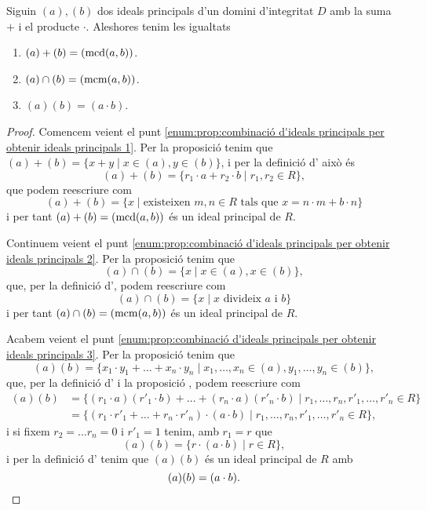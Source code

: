 \documentclass[../Apunts.tex]{subfiles}
\begin{document}
	\begin{proposition}
		\label{prop:combinació d'ideals principals per obtenir ideals principals}
		Siguin \((a),(b)\) dos ideals principals d'un domini d'integritat \(D\) amb la suma \(+\) i el producte \(\cdot\). Aleshores tenim les igualtats
		\begin{enumerate}
			\item\label{enum:prop:combinació d'ideals principals per obtenir ideals principals 1} \((a)+(b)=(\operatorname{mcd}(a,b))\).
			\item\label{enum:prop:combinació d'ideals principals per obtenir ideals principals 2} \((a)\cap(b)=(\operatorname{mcm}(a,b))\).
			\item\label{enum:prop:combinació d'ideals principals per obtenir ideals principals 3} \((a)(b)=(a\cdot b)\).
		\end{enumerate}
		\begin{proof}%
			Comencem veient el punt \eqref{enum:prop:combinació d'ideals principals per obtenir ideals principals 1}. Per la proposició  tenim que \((a)+(b)=\{x+y\mid x\in(a),y\in(b)\}\), i per la definició d' això és
			\[(a)+(b)=\{r_{1}\cdot a+r_{2}\cdot b\mid r_{1},r_{2}\in R\},\]
			que podem reescriure com
			\[(a)+(b)=\{x\mid\text{existeixen }m,n\in R\text{ tals que }x=n\cdot m+b\cdot n\}\]
			i per tant \((a)+(b)=(\operatorname{mcd}(a,b))\) és un ideal principal de \(R\). %
			
			Continuem veient el punt \eqref{enum:prop:combinació d'ideals principals per obtenir ideals principals 2}. Per la proposició  tenim que
			\[(a)\cap(b)=\{x\mid x\in(a),x\in(b)\},\]
			que, per la definició d', podem reescriure com
			\[(a)\cap(b)=\{x\mid x\text{ divideix }a\text{ i }b\}\]
			i per tant \((a)\cap(b)=(\operatorname{mcm}(a,b))\) és un ideal principal de \(R\). %
			
			Acabem veient el punt \eqref{enum:prop:combinació d'ideals principals per obtenir ideals principals 3}. Per la proposició  tenim que
			\[(a)(b)=\{x_{1}\cdot y_{1}+\dots+x_{n}\cdot y_{n}\mid x_{1},\dots,x_{n}\in(a),y_{1},\dots,y_{n}\in(b)\},\]
			que, per la definició d' i la proposició , podem reescriure com
			\begin{align*}
			(a)(b)&=\{(r_{1}\cdot a)(r'_{1}\cdot b)+\dots+(r_{n}\cdot a)(r'_{n}\cdot b)\mid r_{1},\dots,r_{n},r'_{1},\dots,r'_{n}\in R\}\\
			&=\{(r_{1}\cdot r'_{1}+\dots+r_{n}\cdot r'_{n})\cdot(a\cdot b)\mid r_{1},\dots,r_{n},r'_{1},\dots,r'_{n}\in R\},
			\end{align*}
			i si fixem \(r_{2}=\dots r_{n}=0\) i \(r'_{1}=1\) tenim, amb \(r_{1}=r\) que
			\[(a)(b)=\{r\cdot(a\cdot b)\mid r\in R\},\]
			i per la definició d' tenim que \((a)(b)\) és un ideal principal de \(R\) amb
			\[(a)(b)=(a\cdot b).\qedhere\]
		\end{proof}
	\end{proposition}
\end{document}
